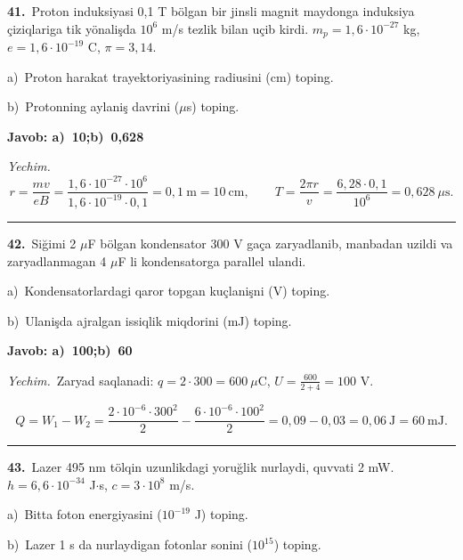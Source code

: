 \documentclass[11pt,a4paper]{article}
\begin{document}
\noindent\textbf{41.}\ Proton induksiyasi 0,1 T bölgan bir jinsli magnit maydonga induksiya çiziqlariga tik yönalişda $10^6$ m/s tezlik bilan uçib kirdi. $m_p=1{,}6\cdot10^{-27}$ kg, $e=1{,}6\cdot10^{-19}$ C, $\pi=3{,}14$.\par
\noindent\hspace*{4mm}a)\ Proton harakat trayektoriyasining radiusini (cm) toping.\par
\noindent\hspace*{4mm}b)\ Protonning aylaniş davrini ($\mu$s) toping.\par
\noindent\colorbox{gray!12}{\parbox{\dimexpr\linewidth-2\fboxsep}{\textbf{Javob: a)\ 10;\quad b)\ 0,628}}}\par\smallskip
\noindent\textit{Yechim.}\ \[r=\frac{mv}{eB}=\frac{1{,}6\cdot10^{-27}\cdot10^6}{1{,}6\cdot10^{-19}\cdot0{,}1}=0{,}1\ \text{m}=10\ \text{cm},\qquad T=\frac{2\pi r}{v}=\frac{6{,}28\cdot0{,}1}{10^6}=0{,}628\ \mu\text{s}.\]\par\medskip\hrule\medskip
{}\noindent\textbf{42.}\ Siğimi 2 $\mu$F bölgan kondensator 300 V gaça zaryadlanib, manbadan uzildi va zaryadlanmagan 4 $\mu$F li kondensatorga parallel ulandi.\par
\noindent\hspace*{4mm}a)\ Kondensatorlardagi qaror topgan kuçlanişni (V) toping.\par
\noindent\hspace*{4mm}b)\ Ulanişda ajralgan issiqlik miqdorini (mJ) toping.\par
\noindent\colorbox{gray!12}{\parbox{\dimexpr\linewidth-2\fboxsep}{\textbf{Javob: a)\ 100;\quad b)\ 60}}}\par\smallskip
\noindent\textit{Yechim.}\ Zaryad saqlanadi: $q=2\cdot300=600\ \mu$C, $U=\frac{600}{2+4}=100$ V.\par
\[Q=W_1-W_2=\frac{2\cdot10^{-6}\cdot300^2}{2}-\frac{6\cdot10^{-6}\cdot100^2}{2}=0{,}09-0{,}03=0{,}06\ \text{J}=60\ \text{mJ}.\]\par\medskip\hrule\medskip
{}\noindent\textbf{43.}\ Lazer 495 nm tölqin uzunlikdagi yoruğlik nurlaydi, quvvati 2 mW. $h=6{,}6\cdot10^{-34}$ J$\cdot$s, $c=3\cdot10^8$ m/s.\par
\noindent\hspace*{4mm}a)\ Bitta foton energiyasini ($10^{-19}$ J) toping.\par
\noindent\hspace*{4mm}b)\ Lazer 1 s da nurlaydigan fotonlar sonini ($10^{15}$) toping.\par
\end{document}
